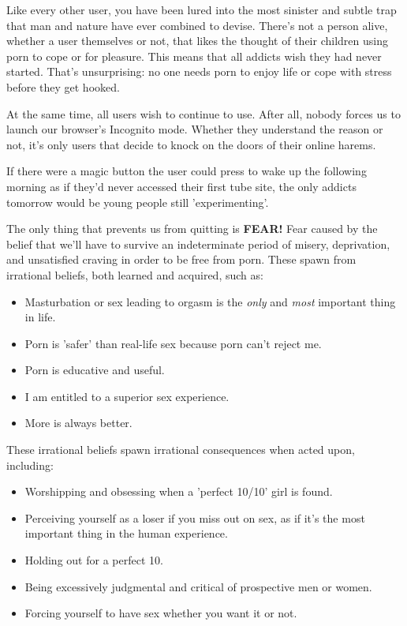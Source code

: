 \documentclass[easypeasy.tex]{subfiles}
\begin{document}
Like every other user, you have been lured into the most sinister and subtle trap that man and nature have ever combined to devise. There's not a person alive, whether a user themselves or not, that likes the thought of their children using porn to cope or for pleasure. This means that all addicts wish they had never started. That's unsurprising: no one needs porn to enjoy life or cope with stress before they get hooked.

At the same time, all users wish to continue to use. After all, nobody forces us to launch our browser's Incognito mode. Whether they understand the reason or not, it's only users that decide to knock on the doors of their online harems.

If there were a magic button the user could press to wake up the following morning as if they'd never accessed their first tube site, the only addicts tomorrow would be young people still 'experimenting'.

The only thing that prevents us from quitting is \textbf{FEAR!} Fear caused by the belief that we'll have to survive an indeterminate period of misery, deprivation, and unsatisfied craving in order to be free from porn. These spawn from irrational beliefs, both learned and acquired, such as:
    \begin{itemize}
      \item Masturbation or sex leading to orgasm is the \textit{only} and \textit{most} important thing in life.
      \item Porn is 'safer' than real-life sex because porn can't reject me.
      \item Porn is educative and useful.
      \item I am entitled to a superior sex experience.
      \item More is always better.
    \end{itemize}
These irrational beliefs spawn irrational consequences when acted upon, including:
  \begin{itemize}
    \item Worshipping and obsessing when a 'perfect 10/10' girl is found.
    \item Perceiving yourself as a loser if you miss out on sex, as if it's the most important thing in the human experience.
    \item Holding out for a perfect 10.
    \item Being excessively judgmental and critical of prospective men or women.
    \item Forcing yourself to have sex whether you want it or not.
  \end{itemize}
\end{document}
